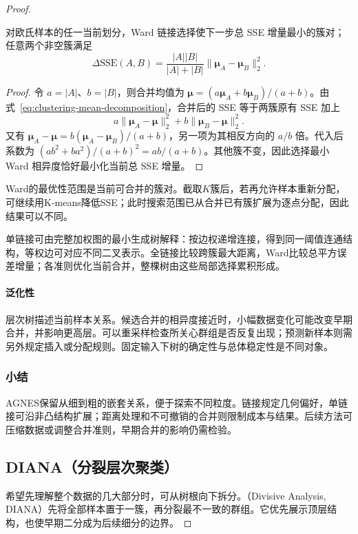 \begin{proof}
\begin{theorem}
 \label{thm:clustering-ward}
 对欧氏样本的任一当前划分，Ward 链接选择使下一步总 SSE 增量最小的簇对；任意两个非空簇满足
 \[
 \Delta\mathrm{SSE}(A,B)
 =\frac{|A||B|}{|A|+|B|}
   \lVert\bm{\mu}_A-\bm{\mu}_B\rVert_2^2.
 \]
\end{theorem}
\begin{proof}
令 $a=|A|$、$b=|B|$，则合并均值为 $\bm{\mu}=(a\bm{\mu}_A+b\bm{\mu}_B)/(a+b)$。由式~\eqref{eq:clustering-mean-decomposition}，合并后的 SSE 等于两簇原有 SSE 加上
\[
 a\lVert\bm{\mu}_A-\bm{\mu}\rVert_2^2+
 b\lVert\bm{\mu}_B-\bm{\mu}\rVert_2^2.
\]
又有 $\bm{\mu}_A-\bm{\mu}=b(\bm{\mu}_A-\bm{\mu}_B)/(a+b)$，另一项为其相反方向的 $a/b$ 倍。代入后系数为 $(ab^2+ba^2)/(a+b)^2=ab/(a+b)$。其他簇不变，因此选择最小 Ward 相异度恰好最小化当前总 SSE 增量。
\end{proof}

Ward的最优性范围是当前可合并的簇对。截取$K$簇后，若再允许样本重新分配，可继续用K-means降低SSE；此时搜索范围已从合并已有簇扩展为逐点分配，因此结果可以不同。

单链接可由完整加权图的最小生成树解释：按边权递增连接，得到同一阈值连通结构，等权边可对应不同二叉表示。全链接比较跨簇最大距离，Ward比较总平方误差增量；各准则优化当前合并，整棵树由这些局部选择累积形成。

\paragraph{泛化性}
层次树描述当前样本关系。候选合并的相异度接近时，小幅数据变化可能改变早期合并，并影响更高层。可以重采样检查所关心群组是否反复出现；预测新样本则需另外规定插入或分配规则。固定输入下树的确定性与总体稳定性是不同对象。

\subsubsection{小结}

AGNES保留从细到粗的嵌套关系，便于探索不同粒度。链接规定几何偏好，单链接可沿非凸结构扩展；距离处理和不可撤销的合并则限制成本与结果。后续方法可压缩数据或调整合并准则，早期合并的影响仍需检验。

\subsection{DIANA（分裂层次聚类）}

希望先理解整个数据的几大部分时，可从树根向下拆分。（Divisive Analysis, DIANA）先将全部样本置于一簇，再分裂最不一致的群组。它优先展示顶层结构，也使早期二分成为后续细分的边界。


\end{proof}
